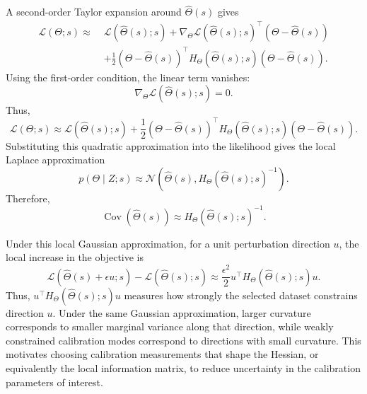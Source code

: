 \documentclass[letterpaper, 9
 pt, conference]{ieeeconf}
\begin{document}
A second-order Taylor expansion around $\hat{\Theta}(s)$ gives
\begin{align}
    \mathcal{L}(\Theta;s)
    \approx\;
    &\mathcal{L}(\hat{\Theta}(s);s)
    +
    \nabla_{\Theta}\mathcal{L}(\hat{\Theta}(s);s)^\top
    (\Theta-\hat{\Theta}(s)) \nonumber \\
    &+
    \frac{1}{2}
    (\Theta-\hat{\Theta}(s))^\top
    H_{\Theta}(\hat{\Theta}(s);s)
    (\Theta-\hat{\Theta}(s)).
\end{align}
Using the first-order condition, the linear term vanishes:
\begin{equation}
    \nabla_{\Theta}\mathcal{L}(\hat{\Theta}(s);s)=0.
\end{equation}
Thus,
\begin{equation}
    \mathcal{L}(\Theta;s)
    \approx
    \mathcal{L}(\hat{\Theta}(s);s)
    +
    \frac{1}{2}
    (\Theta-\hat{\Theta}(s))^\top
    H_{\Theta}(\hat{\Theta}(s);s)
    (\Theta-\hat{\Theta}(s)).
\end{equation}
Substituting this quadratic approximation into the likelihood gives the local Laplace approximation
\begin{equation}
    p(\Theta\mid Z;s)
    \approx
    \mathcal{N}
    \left(
    \hat{\Theta}(s),
    H_{\Theta}(\hat{\Theta}(s);s)^{-1}
    \right).
\end{equation}
Therefore,
\begin{equation}
    \operatorname{Cov}(\hat{\Theta}(s))
    \approx
    H_{\Theta}(\hat{\Theta}(s);s)^{-1}.
\end{equation}

Under this local Gaussian approximation, for a unit perturbation direction $u$, the local increase in the objective is
\begin{equation}
    \mathcal{L}(\hat{\Theta}(s)+\epsilon u;s)
    -
    \mathcal{L}(\hat{\Theta}(s);s)
    \approx
    \frac{\epsilon^2}{2}
    u^\top
    H_{\Theta}(\hat{\Theta}(s);s)
    u.
\end{equation}
Thus, $u^\top H_{\Theta}(\hat{\Theta}(s);s)u$ measures how strongly the selected dataset constrains direction $u$. Under the same Gaussian approximation, larger curvature corresponds to smaller marginal variance along that direction, while weakly constrained calibration modes correspond to directions with small curvature. This motivates choosing calibration measurements that shape the Hessian, or equivalently the local information matrix, to reduce uncertainty in the calibration parameters of interest.
\end{document}
